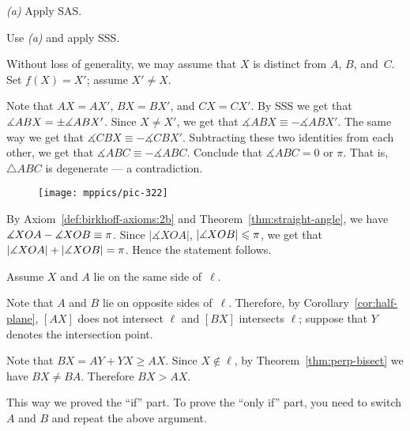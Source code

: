  \textit{(a)} Apply SAS.

 Use \textit{(a)} and apply SSS.

Without loss of generality, we may assume that $X$ is distinct from $A$, $B$, and~$C$.
Set $f(X)=X'$; assume $X'\ne X$.

Note that $AX=AX'$, $BX=BX'$, and $CX=CX'$.
By SSS we get that $\measuredangle ABX\z=\pm\measuredangle ABX'$.
Since $X\ne X'$, we get that
$\measuredangle ABX\equiv - \measuredangle ABX'$.
The same way we get that 
$\measuredangle CBX\equiv - \measuredangle CBX'$.
Subtracting these two identities from each other, we get that
$\measuredangle ABC\equiv -\measuredangle ABC$.
Conclude that $\measuredangle ABC=0$ or $\pi$.
That is, $\triangle ABC$ is degenerate --- a contradiction. 

\setcounter{eqtn}{0}

{

\begin{wrapfigure}{r}{29mm}
\vskip -7mm
\centering
\texttt{[image: mppics/pic-322]}
\end{wrapfigure}

By Axiom~\ref{def:birkhoff-axioms:2b} and Theorem~\ref{thm:straight-angle}, we have
$\measuredangle XOA-\measuredangle XOB\z\equiv\pi$.
Since $|\measuredangle XOA|$, $|\measuredangle XOB|\z\le \pi$, we get that
$|\measuredangle XOA|\z+|\measuredangle XOB|\z=\pi$.
Hence the statement follows. 


Assume $X$ and $A$ lie on the same side of~$\ell$.

Note that $A$ and $B$ lie on opposite sides of~$\ell$.
Therefore, by Corollary~\ref{cor:half-plane}, 
$[AX]$ does not intersect $\ell$ 
and $[BX]$ intersects $\ell$;
suppose that $Y$ denotes the intersection point.

}

Note that $BX=AY+YX\ge AX$.
Since $X\notin\ell$, by Theorem~\ref{thm:perp-bisect} we have $BX\ne BA$.
Therefore $BX> AX$.

This way we proved the ``if'' part.
To prove the ``only if'' part, you need to switch $A$ and $B$ and
repeat the above argument.



